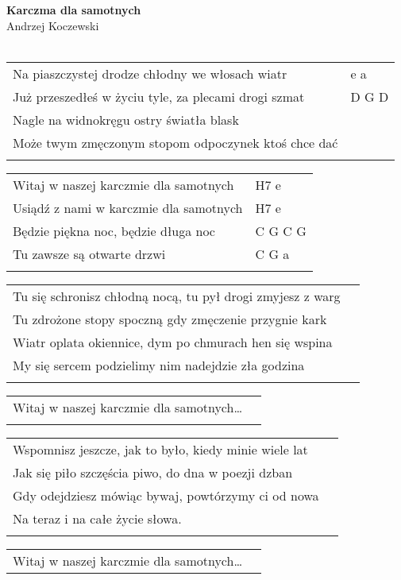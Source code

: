 \documentclass[a5paper]{article}
\begin{document}


\noindent
\fontsize{12pt}{15pt}\selectfont
\textbf{Karczma dla samotnych} \\
\fontsize{8pt}{10pt}\selectfont
Andrzej Koczewski \\ \\
\fontsize{10pt}{12pt}\selectfont
{}
\begin{tabular}{@{}p{9.00cm}p{3cm}@{}}
\noindent
Na piaszczystej drodze chłodny we włosach wiatr & e a \\
Już przeszedłeś w życiu tyle, za plecami drogi szmat & D G D\\
Nagle na widnokręgu ostry światła blask \\
Może twym zmęczonym stopom odpoczynek ktoś chce dać \\ \\
\end{tabular}

\noindent
\begin{tabular}{@{}p{8.00cm}p{3cm}@{}}
Witaj w naszej karczmie dla samotnych & H7 e \\
Usiądź z nami w karczmie dla samotnych & H7 e \\
Będzie piękna noc, będzie długa noc & C G C G \\
Tu zawsze są otwarte drzwi & C G a \\ \\
\end{tabular}

\noindent
\begin{tabular}{@{}p{10.00cm}p{3cm}@{}}
Tu się schronisz chłodną nocą, tu pył drogi zmyjesz z warg \\
Tu zdrożone stopy spoczną gdy zmęczenie przygnie kark\\
Wiatr oplata okiennice, dym po chmurach hen się wspina\\
My się sercem podzielimy nim nadejdzie zła godzina\\\\
\end{tabular}

\noindent
\begin{tabular}{@{}p{8.00cm}p{3cm}@{}}
Witaj w naszej karczmie dla samotnych… \\ \\
\end{tabular}

\noindent
\begin{tabular}{@{}p{10.00cm}p{3cm}@{}}
Wspomnisz jeszcze, jak to było, kiedy minie wiele lat\\
Jak się piło szczęścia piwo, do dna w poezji dzban\\
Gdy odejdziesz mówiąc bywaj, powtórzymy ci od nowa\\
Na teraz i na całe życie słowa.\\\\
\end{tabular}

\noindent
\begin{tabular}{@{}p{8.00cm}p{3cm}@{}}
Witaj w naszej karczmie dla samotnych…
\end{tabular}
\end{document}
